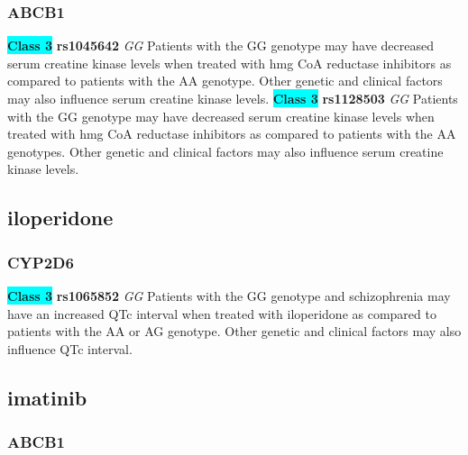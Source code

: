 \documentclass{book}
\begin{document}
\subsubsection{ ABCB1 }

\begin{center}
\textbf{\colorbox{cyan} {Class 3}} \textbf{ rs1045642 } \textit{ GG }
Patients with the GG genotype may have decreased serum creatine kinase levels when treated with hmg CoA reductase inhibitors as compared to patients with the AA genotype. Other genetic and clinical factors may also influence serum creatine kinase levels. \textbf{\colorbox{cyan} {Class 3}} \textbf{ rs1128503 } \textit{ GG }
Patients with the GG genotype may have decreased serum creatine kinase levels when treated with hmg CoA reductase inhibitors as compared to patients with the AA genotypes. Other genetic and clinical factors may also influence serum creatine kinase levels. 


\end{center}\subsection{ iloperidone }


\subsubsection{ CYP2D6 }

\begin{center}
\textbf{\colorbox{cyan} {Class 3}} \textbf{ rs1065852 } \textit{ GG }
Patients with the GG genotype and schizophrenia may have an increased QTc interval when treated with iloperidone as compared to patients with the AA or AG genotype. Other genetic and clinical factors may also influence QTc interval.


\end{center}\subsection{ imatinib }


\subsubsection{ ABCB1 }
\end{document}
